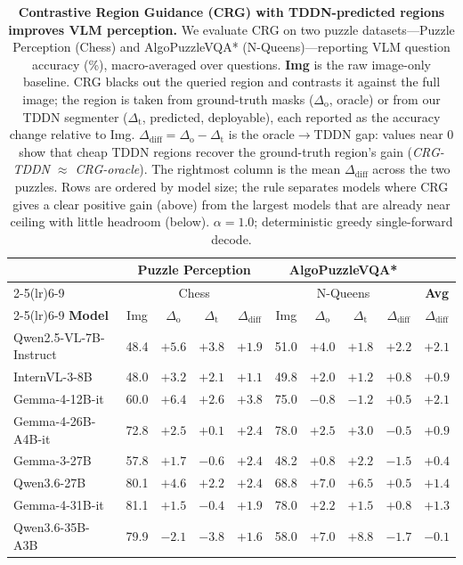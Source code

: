 \begin{table}[t]
\centering
\small
\setlength{\tabcolsep}{4pt}
\caption{\textbf{Contrastive Region Guidance (CRG) with TDDN-predicted regions improves VLM perception.} We evaluate CRG on two puzzle datasets---Puzzle Perception (Chess) and AlgoPuzzleVQA* (N-Queens)---reporting VLM question accuracy (\%), macro-averaged over questions. \textbf{Img} is the raw image-only baseline. CRG blacks out the queried region and contrasts it against the full image; the region is taken from ground-truth masks ($\Delta_{\mathrm{o}}$, oracle) or from our TDDN segmenter ($\Delta_{\mathrm{t}}$, predicted, deployable), each reported as the accuracy change relative to Img. $\Delta_{\mathrm{diff}}=\Delta_{\mathrm{o}}-\Delta_{\mathrm{t}}$ is the oracle$\to$TDDN gap: values near $0$ show that cheap TDDN regions recover the ground-truth region's gain (\emph{CRG-TDDN $\approx$ CRG-oracle}). The rightmost column is the mean $\Delta_{\mathrm{diff}}$ across the two puzzles. Rows are ordered by model size; the rule separates models where CRG gives a clear positive gain (above) from the largest models that are already near ceiling with little headroom (below). $\alpha{=}1.0$; deterministic greedy single-forward decode.}
\label{tab:crg}
\begin{tabular}{l cccc cccc c}
\toprule
& \multicolumn{4}{c}{\textbf{Puzzle Perception}} & \multicolumn{4}{c}{\textbf{AlgoPuzzleVQA*}} & \\
\cmidrule(lr){2-5}\cmidrule(lr){6-9}
& \multicolumn{4}{c}{Chess} & \multicolumn{4}{c}{N-Queens} & \textbf{Avg} \\
\cmidrule(lr){2-5}\cmidrule(lr){6-9}
\textbf{Model} & Img & $\Delta_{\mathrm{o}}$ & $\Delta_{\mathrm{t}}$ & $\Delta_{\mathrm{diff}}$ & Img & $\Delta_{\mathrm{o}}$ & $\Delta_{\mathrm{t}}$ & $\Delta_{\mathrm{diff}}$ & $\Delta_{\mathrm{diff}}$ \\
\midrule
Qwen2.5-VL-7B-Instruct & 48.4 & $+5.6$ & $+3.8$ & $+1.9$ & 51.0 & $+4.0$ & $+1.8$ & $+2.2$ & $+2.1$ \\
InternVL-3-8B & 48.0 & $+3.2$ & $+2.1$ & $+1.1$ & 49.8 & $+2.0$ & $+1.2$ & $+0.8$ & $+0.9$ \\
Gemma-4-12B-it & 60.0 & $+6.4$ & $+2.6$ & $+3.8$ & 75.0 & $-0.8$ & $-1.2$ & $+0.5$ & $+2.1$ \\
Gemma-4-26B-A4B-it & 72.8 & $+2.5$ & $+0.1$ & $+2.4$ & 78.0 & $+2.5$ & $+3.0$ & $-0.5$ & $+0.9$ \\
Gemma-3-27B & 57.8 & $+1.7$ & $-0.6$ & $+2.4$ & 48.2 & $+0.8$ & $+2.2$ & $-1.5$ & $+0.4$ \\
Qwen3.6-27B & 80.1 & $+4.6$ & $+2.2$ & $+2.4$ & 68.8 & $+7.0$ & $+6.5$ & $+0.5$ & $+1.4$ \\
\midrule
Gemma-4-31B-it & 81.1 & $+1.5$ & $-0.4$ & $+1.9$ & 78.0 & $+2.2$ & $+1.5$ & $+0.8$ & $+1.3$ \\
Qwen3.6-35B-A3B & 79.9 & $-2.1$ & $-3.8$ & $+1.6$ & 58.0 & $+7.0$ & $+8.8$ & $-1.7$ & $-0.1$ \\
\bottomrule
\end{tabular}
\end{table}
